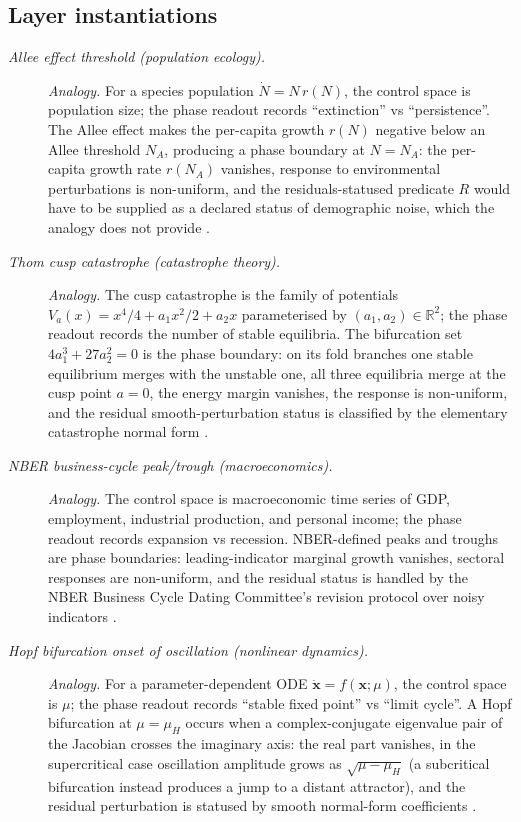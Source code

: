 \subsection*{Layer instantiations}\label{layer-inst:F44}

\begingroup\small
\begin{description}
\item[\emph{Allee effect threshold (population
ecology).}] \textit{Analogy.}
For a species population \(\dot N=N\,r(N)\), the
control space is population size; the phase readout
records ``extinction'' vs ``persistence''.  The Allee
effect makes the per-capita growth \(r(N)\) negative
below an Allee threshold \(N_A\), producing a phase
boundary at \(N=N_A\): the per-capita growth rate
\(r(N_A)\) vanishes, response to environmental perturbations is
non-uniform, and the residuals-statused predicate \(R\) would have
to be supplied as a declared status of demographic
noise, which the analogy does not provide
\citep{Allee1931Aggregations}.

\item[\emph{Thom cusp catastrophe (catastrophe
theory).}] \textit{Analogy.}
The cusp catastrophe is the family of potentials
\(V_a(x)=x^4/4+a_1 x^2/2+a_2 x\) parameterised by
\((a_1,a_2)\in\mathbb R^2\); the phase readout
records the number of stable equilibria.  The
bifurcation set \(4a_1^3+27a_2^2=0\) is the phase boundary: on its
fold branches one stable equilibrium merges with the unstable one,
all three equilibria merge at the cusp point \(a=0\), the energy
margin vanishes, the response is
non-uniform, and the residual smooth-perturbation
status is classified by the elementary catastrophe
normal form \citep{Thom1972Stabilite}.

\item[\emph{{NBER} business-cycle peak/trough
(macroeconomics).}] \textit{Analogy.}
The control space is macroeconomic time series of
GDP, employment, industrial production, and personal
income; the phase readout records expansion vs
recession.  NBER-defined peaks and troughs are
phase boundaries: leading-indicator marginal growth
vanishes, sectoral responses are non-uniform, and
the residual status is handled by the NBER Business
Cycle Dating Committee's revision protocol over
noisy indicators \citep{BurnsMitchell1946Measuring}.

\item[\emph{Hopf bifurcation onset of oscillation
(nonlinear dynamics).}] \textit{Analogy.}
For a parameter-dependent ODE
\(\dot{\mathbf x}=f(\mathbf x;\mu)\), the control
space is \(\mu\); the phase readout records ``stable
fixed point'' vs ``limit cycle''.  A Hopf bifurcation
at \(\mu=\mu_H\) occurs when a complex-conjugate
eigenvalue pair of the Jacobian crosses the
imaginary axis: the real part vanishes, in the supercritical case
oscillation amplitude grows as \(\sqrt{\mu-\mu_H}\) (a subcritical
bifurcation instead produces a jump to a distant attractor), and the
residual perturbation is statused by smooth
normal-form coefficients \citep{Hopf1942Abzweigung}.
\end{description}
\endgroup


